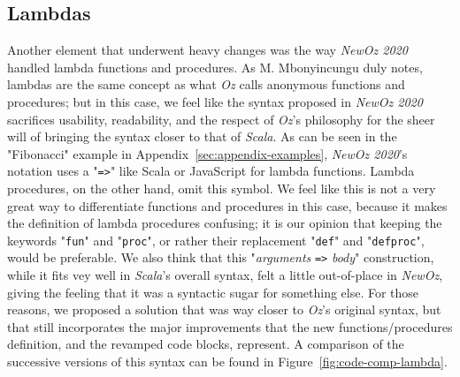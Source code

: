 \subsection{Lambdas}
Another element that underwent heavy changes was the way \textit{NewOz 2020} handled lambda functions and procedures.
As M. Mbonyincungu duly notes, lambdas are the same concept as what \textit{Oz} calls anonymous functions and procedures;
but in this case, we feel like the syntax proposed in \textit{NewOz 2020} sacrifices usability, readability, and the respect of \textit{Oz}'s philosophy for the sheer will of bringing the syntax closer to that of \textit{Scala}.
As can be seen in the "Fibonacci" example in Appendix~\ref{sec:appendix-examples}, \textit{NewOz 2020}'s notation uses a "\texttt{=>}" like Scala or JavaScript for lambda functions.
Lambda procedures, on the other hand, omit this symbol.
We feel like this is not a very great way to differentiate functions and procedures in this case, because it makes the definition of lambda procedures confusing;
it is our opinion that keeping the keywords "\texttt{fun}" and "\texttt{proc}", or rather their replacement "\texttt{def}" and "\texttt{defproc}", would be preferable.\newline
We also think that this "\textit{arguments} \texttt{=>} \textit{body}" construction, while it fits vey well in \textit{Scala}'s overall syntax, felt a little out-of-place in \textit{NewOz}, giving the feeling that it was a syntactic sugar for something else.
For those reasons, we proposed a solution that was way closer to \textit{Oz}'s original syntax, but that still incorporates the major improvements that the new functions/procedures definition, and the revamped code blocks, represent.\newline
A comparison of the successive versions of this syntax can be found in Figure~\ref{fig:code-comp-lambda}.
